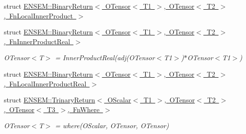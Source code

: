 \begin{DoxyCompactItemize}
struct \mbox{\hyperlink{structENSEM_1_1BinaryReturn_3_01OTensor_3_01T1_01_4_00_01OTensor_3_01T2_01_4_00_01FnLocalInnerProduct_01_4}{E\+N\+S\+E\+M\+::\+Binary\+Return$<$ O\+Tensor$<$ T1 $>$, O\+Tensor$<$ T2 $>$, Fn\+Local\+Inner\+Product $>$}}
\item 
struct \mbox{\hyperlink{structENSEM_1_1BinaryReturn_3_01OTensor_3_01T1_01_4_00_01OTensor_3_01T2_01_4_00_01FnInnerProductReal_01_4}{E\+N\+S\+E\+M\+::\+Binary\+Return$<$ O\+Tensor$<$ T1 $>$, O\+Tensor$<$ T2 $>$, Fn\+Inner\+Product\+Real $>$}}
\begin{DoxyCompactList}\small\item\em O\+Tensor$<$\+T$>$ = Inner\+Product\+Real(adj(\+O\+Tensor$<$\+T1$>$)$\ast$\+O\+Tensor$<$\+T1$>$) \end{DoxyCompactList}\item 
struct \mbox{\hyperlink{structENSEM_1_1BinaryReturn_3_01OTensor_3_01T1_01_4_00_01OTensor_3_01T2_01_4_00_01FnLocalInnerProductReal_01_4}{E\+N\+S\+E\+M\+::\+Binary\+Return$<$ O\+Tensor$<$ T1 $>$, O\+Tensor$<$ T2 $>$, Fn\+Local\+Inner\+Product\+Real $>$}}
\item 
struct \mbox{\hyperlink{structENSEM_1_1TrinaryReturn_3_01OScalar_3_01T1_01_4_00_01OTensor_3_01T2_01_4_00_01OTensor_3_01T3_01_4_00_01FnWhere_01_4}{E\+N\+S\+E\+M\+::\+Trinary\+Return$<$ O\+Scalar$<$ T1 $>$, O\+Tensor$<$ T2 $>$, O\+Tensor$<$ T3 $>$, Fn\+Where $>$}}
\begin{DoxyCompactList}\small\item\em O\+Tensor$<$\+T$>$ = where(\+O\+Scalar, O\+Tensor, O\+Tensor) \end{DoxyCompactList}\end{DoxyCompactItemize}
